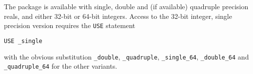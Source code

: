 The package is available with single, double and (if available) 
quadruple precision reals, and either 32-bit or 64-bit integers. 
Access to the 32-bit integer,
single precision version requires the {\tt USE} statement
\medskip

\hspace{8mm} {\tt USE \fullpackagename\_single}

\medskip
\noindent
with the obvious substitution 
{\tt \fullpackagename\_double},
{\tt \fullpackagename\_quadruple},
{\tt \fullpackagename\_single\_64},
{\tt \fullpackagename\_double\_64} and
{\tt \fullpackagename\_quadruple\_64} for the other variants.

